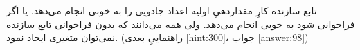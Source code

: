 \section{}
\paragraph{}\label{hint:4}
تابع سازنده کارِ مقداردهیِ اولیه اعداد جادویی را به خوبی انجام می‌دهد. یا اگر فراخوانی شود به خوبی انجام می‌دهد. ولی همه می‌دانند که بدون فراخوانی تابع سازنده نمی‌توان متغیری ایجاد نمود. (راهنماییِ بعدی \ref{hint:300}، جواب \ref{answer:98})